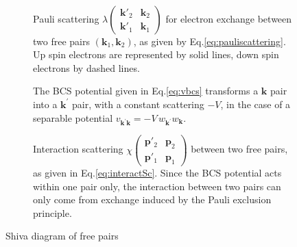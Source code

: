 \documentclass[aps,prb,superscriptaddress,twocolumn]{revtex4}
\newcommand{\vk}{\ensuremath{\mathbf{k}}}
\newcommand{\vp}{\ensuremath{\mathbf{p}}}
\begin{document}
\begin{figure}[htb]
\caption{Shiva diagram of free pairs }\centering
\par
  \qquad
 \\
\par
\begin{description}
\item[] Pauli scattering $\lambda\left(%
\begin{smallmatrix}\vk'_2&\vk_2\\\vk'_1&\vk_1\end{smallmatrix}\right)  $ for
electron exchange between two free pairs $\left(\mathbf{k} _1,\mathbf{k}
_2\right) $, as given by Eq.\eqref{eq:pauliscattering}. Up spin electrons
are represented by solid lines, down spin electrons by dashed lines. 
\par
\item[] The BCS potential given in Eq.\eqref{eq:vbcs}
transforms a $\mathbf{k} $ pair into a $\mathbf{k} ^{\prime}$ pair, with a
constant scattering $-V$, in the case of a separable potential $v_{\mathbf{k}
^{\prime}\mathbf{k} }=-V\,w_{\mathbf{k} ^{\prime}}w_{\mathbf{k} }$.
\par
\item[] Interaction scattering $\chi\left(%
\begin{smallmatrix}\vp'_2&\vp_2\\\vp'_1&\vp_1\end{smallmatrix}\right)  $
between two free pairs, as given in Eq.\eqref{eq:interactSc}. Since the BCS
potential acts within one pair only, the interaction between two pairs can
only come from exchange induced by the Pauli exclusion principle. 
\end{description}

\end{figure}
\end{document}
